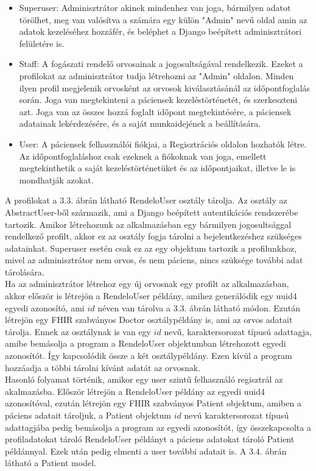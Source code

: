 \begin{itemize}
	\item Superuser: Adminisztrátor akinek mindenhez van joga, bármilyen adatot törölhet, meg van valósítva a számára egy külön "Admin" nevű oldal amin az adatok kezeléséhez hozzáfér, és beléphet a Django beépített adminisztrátori felületére is.
	\item Staff: A fogászati rendelő orvosainak a jogosultságával rendelkezik. Ezeket a profilokat az adminisztrátor tudja létrehozni az "Admin" oldalon. Minden ilyen profil megjelenik orvosként az orvosok kiválasztásánál az időpontfoglalás során. Joga van megtekinteni a páciensek kezeléstörténetét, és szerkeszteni azt. Joga van az összes hozzá foglalt időpont megtekintésére, a páciensek adatainak lekérdezésére, és a saját munkaidejének a beállítására.
	\item User: A páciensek felhasználói fiókjai, a Regisztrációs oldalon hozhatók létre. Az időpontfoglaláshoz csak ezeknek a fiókoknak van joga, emellett megtekinthetik a saját kezeléstörténetüket és az időpontjaikat, illetve le is mondhatják azokat.
\end{itemize}

A profilokat a 3.3. ábrán látható RendeloUser osztály tárolja. Az osztály az AbstractUser-ből származik, ami a Django beépített autentikációs rendszerébe tartozik. Amikor létrehozunk az alkalmazásban egy bármilyen jogosultsággal rendelkező profilt, akkor ez az osztály fogja tárolni a bejelentkezéshez szükséges adatainkat. Superuser esetén csak ez az egy objektum tartozik a profilunkhoz, mivel az adminisztrátor nem orvos, és nem páciens, nincs szüksége további adat tárolására.\\

Ha az adminisztrátor létrehoz egy új orvosnak egy profilt az alkalmazásban, akkor először is létrejön a RendeloUser példány, amihez generálódik egy uuid4 egyedi azonosító, ami $id$ néven van tárolva a 3.3. ábrán látható módon. Ezután létrejön egy FHIR szabványos Doctor osztálypéldány is, ami az orvos adatait tárolja. Ennek az osztálynak is van egy $id$ nevű, karaktersorozat típusú adattagja, amibe bemásolja a program a RendeloUser objektumban létrehozott egyedi azonosítót. Így kapcsolódik össze a két osztálypéldány. Ezen kívül a program hozzáadja a többi tárolni kívánt adatát az orvosnak.\\

Hasonló folyamat történik, amikor egy user szintű felhasználó regisztrál az akalmazásba. Először létrejön a RendeloUser példány az egyedi uuid4 azonosítóval, ezután létrejön egy FHIR szabványos Patient objektum, amiben a páciens adatait tároljuk, a Patient objektum $id$ nevú karaktersorozat típusú adattagjába pedig bemásolja a program az egyedi azonosítót, így összekapcsolta a profiladatokat tároló RendeloUser példányt a páciens adatokat tároló Patient példánnyal. Ezek után pedig elmenti a user további adatait is. A 3.4. ábrán látható a Patient model.

